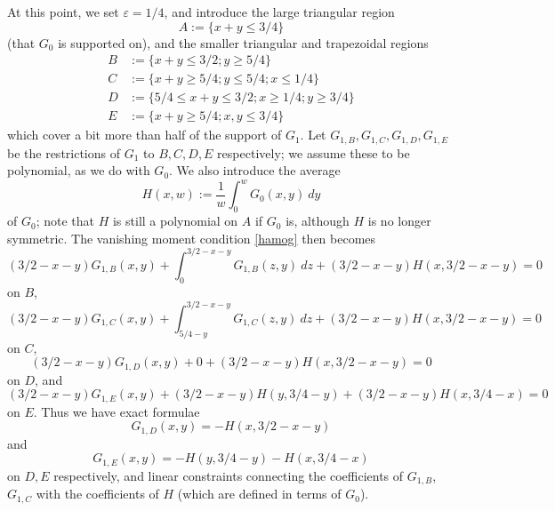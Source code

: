 \documentclass[12pt,a4paper,reqno]{amsart}
\numberwithin{equation}{section}
\theoremstyle{plain}
\theoremstyle{definition}
\newcommand\eps{\varepsilon}
\begin{document}
At this point, we set $\eps=1/4$, and introduce the large triangular region
$$ A := \{ x+y \leq 3/4\}$$
(that $G_0$ is supported on), and the smaller triangular and trapezoidal regions
\begin{align*}
B &:= \{ x+y \leq 3/2; y \geq 5/4 \}\\
C &:= \{ x+y \geq 5/4; y \leq 5/4; x \leq 1/4 \}\\
D &:= \{ 5/4 \leq x+y \leq 3/2; x \geq 1/4; y \geq 3/4 \}\\
E &:= \{ x+y \geq 5/4; x,y \leq 3/4 \}
\end{align*}
which cover a bit more than half of the support of $G_1$.  Let $G_{1,B}, G_{1,C}, G_{1,D}, G_{1,E}$ be the restrictions of $G_1$ to $B,C,D,E$ respectively; we assume these to be polynomial, as we do with $G_0$.  We also introduce the average
\begin{equation}\label{haxw} 
H(x,w) := \frac{1}{w} \int_0^w G_0(x,y)\ dy
\end{equation}
of $G_0$; note that $H$ is still a polynomial on $A$ if $G_0$ is, although $H$ is no longer symmetric.  The vanishing moment condition \eqref{hamog} then becomes
\begin{equation}\label{gwb}
 (3/2-x-y) G_{1,B}(x,y) + \int_0^{3/2-x-y} G_{1,B}(z,y)\ dz + (3/2-x-y) H(x,3/2-x-y) = 0
\end{equation}
on $B$,
\begin{equation}\label{gwc}
 (3/2-x-y) G_{1,C}(x,y) + \int_{5/4-y}^{3/2-x-y} G_{1,C}(z,y)\ dz + (3/2-x-y) H(x,3/2-x-y) = 0
\end{equation}
on $C$,
\begin{equation}\label{gwd}
 (3/2-x-y) G_{1,D}(x,y) + 0  + (3/2-x-y) H(x,3/2-x-y) = 0
\end{equation}
on $D$, and
\begin{equation}\label{gwe}
 (3/2-x-y) G_{1,E}(x,y) + (3/2-x-y) H(y,3/4-y) + (3/2-x-y) H(x,3/4-x) = 0
\end{equation}
on $E$.  Thus we have exact formulae
\begin{equation}\label{gwd-1}
G_{1,D}(x,y) = - H(x,3/2-x-y) 
\end{equation}
and
\begin{equation}\label{gwe-1}
G_{1,E}(x,y) = - H(y,3/4-y) - H(x,3/4-x)
\end{equation}
on $D,E$ respectively, and linear constraints connecting the coefficients of $G_{1,B}$, $G_{1,C}$ with the coefficients of $H$ (which are defined in terms of $G_0$).
\end{document}
